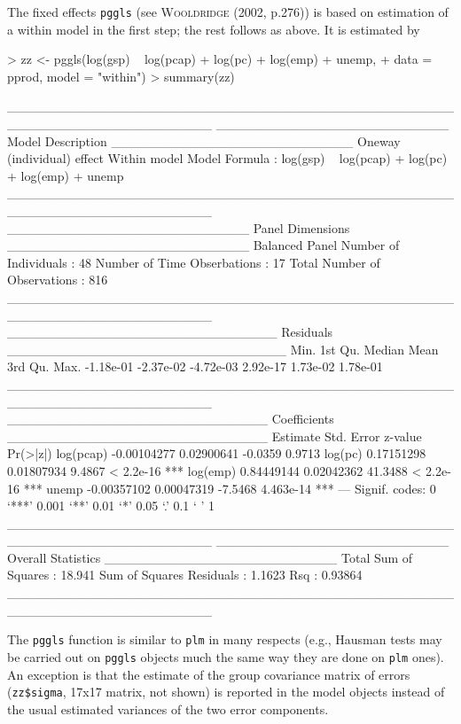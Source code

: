 \documentclass{article}
\begin{document}
The fixed effects \texttt{pggls} (see \textsc{Wooldridge} (2002, p.276)) is based on estimation of a within model in the first step; the rest follows as above. It is estimated by

\begin{Schunk}
\begin{Sinput}
> zz <- pggls(log(gsp) ~ log(pcap) + log(pc) + log(emp) + unemp, 
+     data = pprod, model = "within")
> summary(zz)
\end{Sinput}
\begin{Soutput}
______________________________________________________________________ 
_________________________ Model Description __________________________
Oneway (individual) effect
Within model
Model Formula             : log(gsp) ~ log(pcap) + log(pc) + 
                                log(emp) + unemp
______________________________________________________________________ 
__________________________ Panel Dimensions __________________________
Balanced Panel
Number of Individuals        :  48
Number of Time Obserbations  :  17
Total Number of Observations :  816
______________________________________________________________________ 
_____________________________ Residuals ______________________________
     Min.   1st Qu.    Median      Mean   3rd Qu.      Max. 
-1.18e-01 -2.37e-02 -4.72e-03  2.92e-17  1.73e-02  1.78e-01 
______________________________________________________________________ 
____________________________ Coefficients ____________________________
             Estimate  Std. Error z-value  Pr(>|z|)    
log(pcap) -0.00104277  0.02900641 -0.0359    0.9713    
log(pc)    0.17151298  0.01807934  9.4867 < 2.2e-16 ***
log(emp)   0.84449144  0.02042362 41.3488 < 2.2e-16 ***
unemp     -0.00357102  0.00047319 -7.5468 4.463e-14 ***
---
Signif. codes:  0 ‘***’ 0.001 ‘**’ 0.01 ‘*’ 0.05 ‘.’ 0.1 ‘ ’ 1 
______________________________________________________________________ 
_________________________ Overall Statistics _________________________
Total Sum of Squares       : 18.941
Sum of Squares Residuals   : 1.1623
Rsq                        : 0.93864
______________________________________________________________________ 
\end{Soutput}
\end{Schunk}

The \texttt{pggls} function is similar to \texttt{plm} in many respects (e.g., Hausman tests may be carried out on \texttt{pggls} objects much the same way they are done on \texttt{plm} ones). An exception is that the estimate of the group covariance matrix of errors (\verb!zz$sigma!, 17x17 matrix, not shown) is reported in the model objects instead of the usual estimated variances of the two error components.
\end{document}
